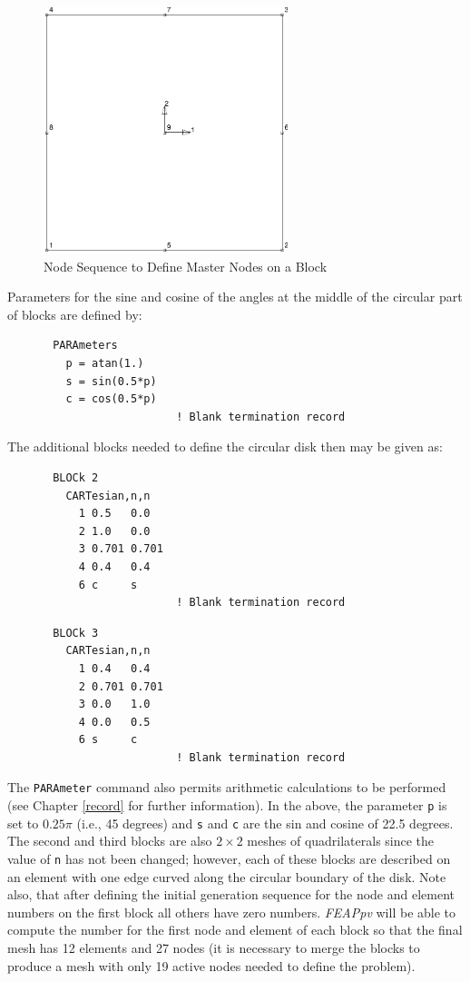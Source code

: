 \begin{figure}[ht!]
\centerline {\hfil \includegraphics[width=2.8in]{figs/fig3a} \hfil}
\caption{Node Sequence to Define Master Nodes on a Block}
\label{fig5}
\end{figure}

Parameters for the sine and cosine of the angles at
the middle of the circular part of blocks are defined by:
\begin{verbatim}
       PARAmeters
         p = atan(1.)
         s = sin(0.5*p)
         c = cos(0.5*p)
                          ! Blank termination record
\end{verbatim}
The additional blocks needed to define the circular disk then may be given as:
\begin{verbatim}
       BLOCk 2
         CARTesian,n,n
           1 0.5   0.0
           2 1.0   0.0
           3 0.701 0.701
           4 0.4   0.4
           6 c     s
                          ! Blank termination record
\end{verbatim}
\begin{verbatim}
       BLOCk 3
         CARTesian,n,n
           1 0.4   0.4
           2 0.701 0.701
           3 0.0   1.0
           4 0.0   0.5
           6 s     c
                          ! Blank termination record
\end{verbatim}
The {\tt PARAmeter} command also permits arithmetic calculations
to be performed (see Chapter \ref{record} for further information).
In the above, the parameter {\tt p} is set to
$0.25 \pi$ (i.e., 45 degrees) and {\tt s} and {\tt c}
are the sin and cosine of 22.5 degrees.
The second and third blocks are also $2 \times 2$ meshes of quadrilaterals since
the value of {\tt n} has not been changed; however, each of these blocks are
described on an element with one edge curved along the circular boundary
of the disk.  Note also, that after defining the initial generation
sequence for the node and element numbers on the first block all others
have zero numbers. {\sl FEAPpv} will be able to compute the number for
the first node and element of each block so that the final mesh has 12
elements and 27 nodes (it is necessary to merge the blocks to produce
a mesh with only 19 active nodes needed to define the problem).

